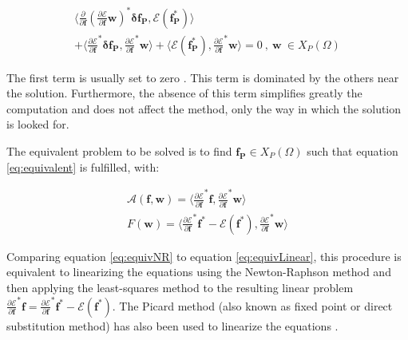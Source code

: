 \documentclass{CFD2011}
\begin{document}
\begin{eqnarray}
\big\langle \frac{\partial}{\partial \mathbf{f}} \left(\frac{\partial\mathcal{E}}{\partial \mathbf{f}}\mathbf{w}\right)^*\mathbf{\delta f_P} , \mathcal{E}(\mathbf{f^*_P}) \big\rangle  \nonumber \\
+\big\langle \frac{\partial \mathcal{E}}{\partial \mathbf{f}}^*\mathbf{\delta f_P} , \frac{\partial \mathcal{E}}{\partial \mathbf{f}}^*\mathbf{w} \big\rangle +
\big\langle \mathcal{E}(\mathbf{f^*_P}) , \frac{\partial \mathcal{E}}{\partial \mathbf{f}}^*\mathbf{w} \big\rangle =0 \ ,\ \mathbf{w} \ \in X_P(\Omega)
\end{eqnarray}

The first term is usually set to zero \cite{Winterscheidt1994, Codd2001}. This term is dominated by the others near the solution. Furthermore, the absence of this term simplifies greatly the computation and does not affect the method, only the way in which the solution is looked for.

The equivalent problem to be solved is to find $\mathbf{f_P} \in X_P(\Omega)$ such that equation \ref{eq:equivalent} is fulfilled, with:


\begin{eqnarray}
\mathcal{A}(\mathbf{f},\mathbf{w})= \big\langle \frac{\partial \mathcal{E}}{\partial \mathbf{f}}^*\mathbf{f} ,  \frac{\partial \mathcal{E}}{\partial \mathbf{f}}^*\mathbf{w} \big\rangle \nonumber \\
F(\mathbf{w})= \big\langle \frac{\partial \mathcal{E}}{\partial \mathbf{f}}^*\mathbf{f^*}-\mathcal{E}(\mathbf{f^*}) , \frac{\partial \mathcal{E}}{\partial \mathbf{f}}^*\mathbf{w} \big\rangle 
\label{eq:equivNR}
\end{eqnarray}


Comparing equation \ref{eq:equivNR} to equation \ref{eq:equivLinear}, this procedure is equivalent to linearizing the equations using the Newton-Raphson method and then applying the least-squares method to the resulting linear problem $ \frac{\partial \mathcal{E}}{\partial \mathbf{f}}^*\mathbf{f}=\frac{\partial \mathcal{E}}{\partial \mathbf{f}}^*\mathbf{f^*}-\mathcal{E}(\mathbf{f^*})$. The Picard method (also known as fixed point or direct substitution method) has also been used to linearize the equations \cite{Sporleder2010}.
\end{document}
